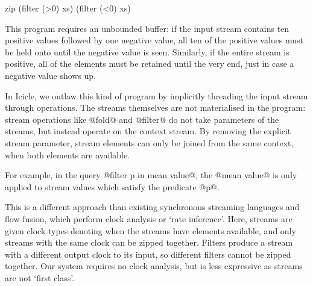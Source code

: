 \begin{code}
zip (filter (>0) xs) (filter (<0) xs)
\end{code}

This program requires an unbounded buffer: if the input stream contains ten positive values followed by one negative value, all ten of the positive values must be held onto until the negative value is seen.
Similarly, if the entire stream is positive, all of the elements must be retained until the very end, just in case a negative value shows up.

In Icicle, we outlaw this kind of program by implicitly threading the input stream through operations.
The streams themselves are not materialised in the program: stream operations like @fold@ and @filter@ do not take parameters of the streams, but instead operate on the context stream.
By removing the explicit stream parameter, stream elements can only be joined from the same context, when both elements are available.

For example, in the query @filter p in mean value@, the @mean value@ is only applied to stream values which satisfy the predicate @p@.

This is a different approach than existing synchronous streaming languages\cite{mandel2010lucy} and flow fusion\cite{lippmeier2013data}, which perform clock analysis or `rate inference'.
Here, streams are given clock types denoting when the streams have elements available, and only streams with the same clock can be zipped together.
Filters produce a stream with a different output clock to its input, so different filters cannot be zipped together.
Our system requires no clock analysis, but is less expressive as streams are not `first class'.

